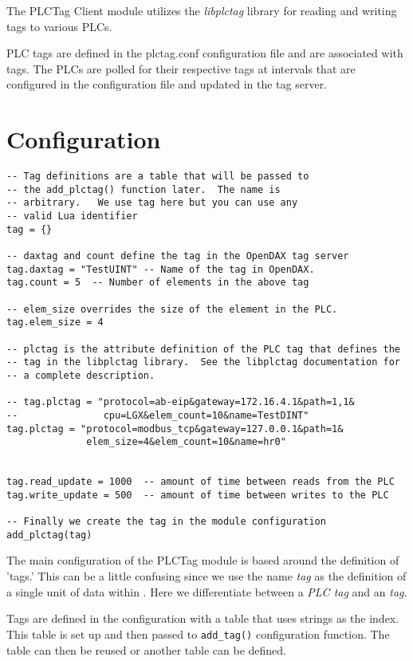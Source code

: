 The PLCTag Client module utilizes the \textit{libplctag} library for reading
and writing tags to various PLCs.

PLC tags are defined in the plctag.conf configuration file and are associated
with \opendax{} tags.  The PLCs are polled for their respective tags at intervals
that are configured in the configuration file and updated in the \opendax{}
tag server.

\section{Configuration}

\begin{verbatim}
-- Tag definitions are a table that will be passed to
-- the add_plctag() function later.  The name is
-- arbitrary.   We use tag here but you can use any
-- valid Lua identifier
tag = {}

-- daxtag and count define the tag in the OpenDAX tag server
tag.daxtag = "TestUINT" -- Name of the tag in OpenDAX.
tag.count = 5  -- Number of elements in the above tag

-- elem_size overrides the size of the element in the PLC.
tag.elem_size = 4

-- plctag is the attribute definition of the PLC tag that defines the
-- tag in the libplctag library.  See the libplctag documentation for
-- a complete description. 

-- tag.plctag = "protocol=ab-eip&gateway=172.16.4.1&path=1,1&
--               cpu=LGX&elem_count=10&name=TestDINT"
tag.plctag = "protocol=modbus_tcp&gateway=127.0.0.1&path=1&
              elem_size=4&elem_count=10&name=hr0"


tag.read_update = 1000  -- amount of time between reads from the PLC
tag.write_update = 500  -- amount of time between writes to the PLC

-- Finally we create the tag in the module configuration
add_plctag(tag)
\end{verbatim}

The main configuration of the PLCTag module is based around the 
definition of 'tags.'  This can be a little confusing since we
use the name \textit{tag} as the definition of a single unit of
data within \opendax.  Here we differentiate between a \textit{PLC tag} and
an \opendax{} \textit{tag}.

Tags are defined in the configuration with a table that uses
strings as the index.  This table is set up and then passed to
\texttt{add\_tag()} configuration function.  The table can then
be reused or another table can be defined.

